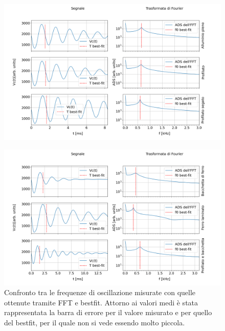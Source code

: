 \documentclass{article}
\begin{document}
        \begin{figure}[H]
            \centering
            \includegraphics[width=\textwidth]{FFT13/FFTMATERIALS1.png}
        \end{figure}

        \begin{figure}[H]
            \includegraphics[width=\textwidth]{FFT13/FFTMATERIALS2.png}
            \caption{Confronto tra le frequenze di oscillazione misurate con quelle ottenute tramite FFT e bestfit.
            Attorno ai valori medi è stata rappresentata la barra di errore per il valore
            misurato e per quello del bestfit, per il quale non si vede essendo molto piccola.}
            \label{fig:mat_smor}
        \end{figure}
\end{document}
